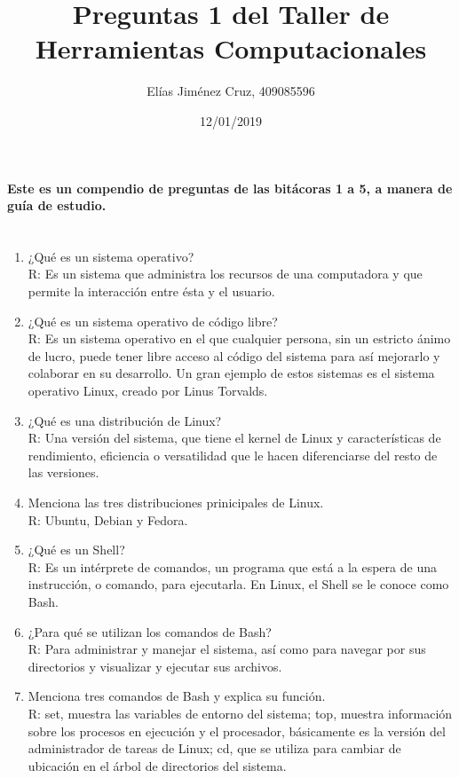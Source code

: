 \documentclass[letterpaper, 12pt, oneside]{article} %
\title{\Huge Preguntas 1 del Taller de Herramientas Computacionales}
\author{Elías Jiménez Cruz, 409085596}
\date{12/01/2019}
\begin{document}
	\maketitle
	\paragraph{Este es un compendio de preguntas de las bitácoras 1 a 5, a manera de guía de estudio.\\\\}
	\begin{enumerate}
		\item ¿Qué es un sistema operativo?\\R: Es un sistema que administra los recursos de una computadora y que permite la interacción entre ésta y el usuario.\\
		\item ¿Qué es un sistema operativo de código libre?\\R: Es un sistema operativo en el que cualquier persona, sin un estricto ánimo de lucro, puede tener libre acceso al código del sistema para así mejorarlo y colaborar en su desarrollo. Un gran ejemplo de estos sistemas es el sistema operativo Linux, creado por Linus Torvalds.\\
		\item ¿Qué es una distribución de Linux?\\R: Una versión del sistema, que tiene el kernel de Linux y características de rendimiento, eficiencia o versatilidad que le hacen diferenciarse del resto de las versiones.\\
		\item Menciona las tres distribuciones prinicipales de Linux.\\R: Ubuntu, Debian y Fedora.\\
		\item ¿Qué es un Shell?\\R: Es un intérprete de comandos, un programa que está a la espera de una instrucción, o comando, para ejecutarla. En Linux, el Shell se le conoce como Bash.\\
		\item ¿Para qué se utilizan los comandos de Bash?\\R: Para administrar y manejar el sistema, así como para navegar por sus directorios y visualizar y ejecutar sus archivos.\\
		\item Menciona tres comandos de Bash y explica su función.\\R: set, muestra las variables de entorno del sistema; top, muestra información sobre los procesos en ejecución y el procesador, básicamente es la versión del administrador de tareas de Linux; cd, que se utiliza para cambiar de ubicación en el árbol de directorios del sistema.\\

\end{enumerate}
\end{document}
